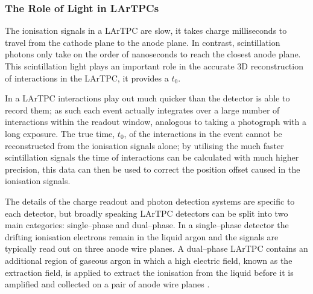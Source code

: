 \subsubsection*{The Role of Light in LArTPCs}

The ionisation signals in a LArTPC are slow, it takes charge milliseconds to
travel from the cathode plane to the anode plane. In contrast, scintillation 
photons only take on the order of nanoseconds to reach the closest anode 
plane. This scintillation light plays an important role in the accurate 3D 
reconstruction of interactions in the LArTPC, it provides a $t_0$. 

In a LArTPC interactions play out much quicker than the detector is able to 
record them; as such each event actually integrates over a large number of
interactions within the readout window, analogous to taking a photograph with a 
long exposure. The true time, $t_0$, of the interactions in the event cannot be 
reconstructed from the ionisation signals alone; by utilising the much faster 
scintillation signals the time of interactions can be calculated with much 
higher precision, this data can then be used to correct the position offset
caused in the ionisation signals.

\bigskip

The details of the charge readout and photon detection systems are specific to 
each detector, but broadly speaking LArTPC detectors can be split into two 
main categories: single--phase and dual--phase. In a single--phase detector the
drifting ionisation electrons remain in the liquid argon and the signals are 
typically read out on three anode wire planes. A dual--phase LArTPC contains an
additional region of gaseous argon in which a high electric field, known as the
extraction field, is applied to extract the ionisation from the liquid 
before it is amplified and collected on a pair of anode wire planes 
\cite{Abi:2020wmh}.

\bigskip

